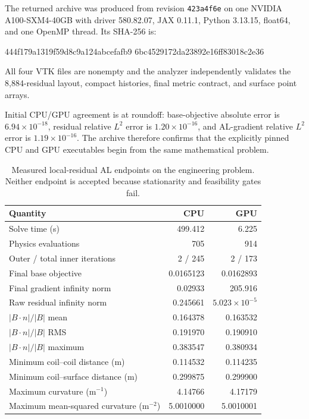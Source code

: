\documentclass[11pt,a4paper]{article}
\newcommand{\code}[1]{\texttt{#1}}
\begin{document}
The returned archive was produced from revision \code{423a4f6e} on one NVIDIA
A100-SXM4-40GB with driver 580.82.07, JAX 0.11.1, Python 3.13.15, float64, and
one OpenMP thread.  Its SHA-256 is:
\begin{center}
\small\ttfamily
444f179a1319f59d8c9a124abcefafb9\allowbreak
6bc4529172da23892e16ff83018c2e36
\end{center}
All four VTK files are nonempty and the analyzer independently validates the
8,884-residual layout, compact histories, final metric contract, and surface
point arrays.

Initial CPU/GPU agreement is at roundoff: base-objective absolute error is
$6.94\times10^{-18}$, residual relative $L^2$ error is
$1.20\times10^{-16}$, and AL-gradient relative $L^2$ error is
$1.19\times10^{-16}$.  The archive therefore confirms that the explicitly
pinned CPU and GPU executables begin from the same mathematical problem.

\begin{table}[htbp]
\centering
\caption{Measured local-residual AL endpoints on the engineering problem.
Neither endpoint is accepted because stationarity and feasibility gates fail.}
\label{tab:local-residual-al-result}
\begin{tabular}{lrr}
\toprule
Quantity & CPU & GPU \\
\midrule
Solve time (s) & 499.412 & 6.225 \\
Physics evaluations & 705 & 914 \\
Outer / total inner iterations & 2 / 245 & 2 / 173 \\
Final base objective & 0.0165123 & 0.0162893 \\
Final gradient infinity norm & 0.02933 & 205.916 \\
Raw residual infinity norm & 0.245661 & $5.023\times10^{-5}$ \\
$|B\cdot n|/|B|$ mean & 0.164378 & 0.163532 \\
$|B\cdot n|/|B|$ RMS & 0.191970 & 0.190910 \\
$|B\cdot n|/|B|$ maximum & 0.383547 & 0.380934 \\
Minimum coil--coil distance (m) & 0.114532 & 0.114235 \\
Minimum coil--surface distance (m) & 0.299875 & 0.299900 \\
Maximum curvature (m$^{-1}$) & 4.14766 & 4.17179 \\
Maximum mean-squared curvature (m$^{-2}$) & 5.0010000 & 5.0010001 \\
\bottomrule
\end{tabular}
\end{table}
\end{document}
